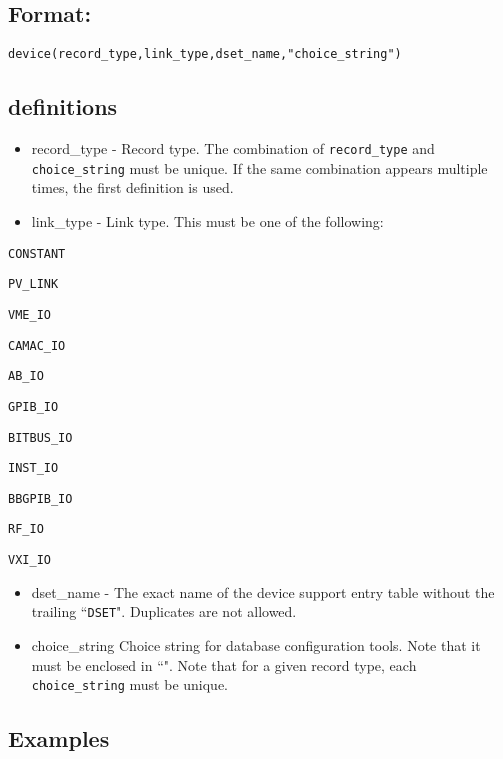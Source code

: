 \subsection{Format:}

\begin{verbatim}device(record_type,link_type,dset_name,"choice_string")
\end{verbatim}\subsection{definitions}

\begin{itemize}\item {}record\_type - Record type. The combination of \verb|record_type| and  \verb|choice_string| must be unique. If the 
same combination appears multiple times, the first definition is used. 

\item {}link\_type - Link type. This must be one of the following:

\end{itemize}\verb|CONSTANT|

\verb|PV_LINK|

\verb|VME_IO|

\verb|CAMAC_IO|

\verb|AB_IO|

\verb|GPIB_IO|

\verb|BITBUS_IO|

\verb|INST_IO|

\verb|BBGPIB_IO|

\verb|RF_IO|

\verb|VXI_IO|

\begin{itemize}\item {}dset\_name -  The exact name of the device support entry table without the trailing ``\verb|DSET|". Duplicates are not 
allowed.

\item {}choice\_string  Choice string for database configuration tools. Note that it must be enclosed in ``". Note that for a 
given record type, each \verb|choice_string| must be unique.

\end{itemize}\subsection{Examples}

